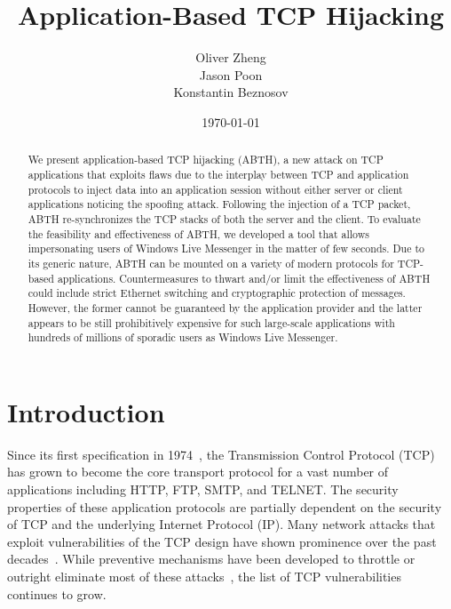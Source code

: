 \documentclass{sig-alternate}
\begin{document}

\title{
Application-Based TCP Hijacking
}

\author {
	\alignauthor
	Oliver Zheng\\
	\alignauthor
	Jason Poon\\
	\alignauthor
	Konstantin Beznosov\\
}

\date{\today}

\maketitle

\begin{abstract}
We present application-based TCP hijacking (ABTH), a new attack on TCP applications that exploits flaws due to the interplay between TCP and application protocols to inject data into an application session without either server or client applications noticing the spoofing attack. 
Following the injection of a TCP packet, ABTH re-synchronizes the TCP stacks of both the server and the client. 
To evaluate the feasibility and effectiveness of ABTH, we developed a tool that allows impersonating users of Windows Live Messenger in the matter of few seconds. 
Due to its generic nature, ABTH can be mounted on a variety of modern protocols for TCP-based applications.
Countermeasures to thwart and/or limit the effectiveness of ABTH could include strict Ethernet switching and cryptographic protection of messages. However, the former cannot be guaranteed by the application provider and the latter appears to be still prohibitively expensive for such large-scale applications with hundreds of millions of sporadic users as Windows Live Messenger.
\end{abstract}



\section{Introduction}

Since its first specification in 1974~\cite{rfc:tcp}, the Transmission Control Protocol (TCP) has grown to become the core transport protocol for a vast number of applications including HTTP, FTP, SMTP, and TELNET.
The security properties of these application protocols are partially dependent on the security of TCP and the underlying Internet Protocol (IP).
Many network attacks that exploit vulnerabilities of the TCP design have shown prominence over the past decades~\cite{harris:tcpattacks}.
While preventive mechanisms have been developed to throttle or outright eliminate most of these attacks~\cite{dubrawsky:layer2}, the list of TCP vulnerabilities continues to grow.
\end{document}
